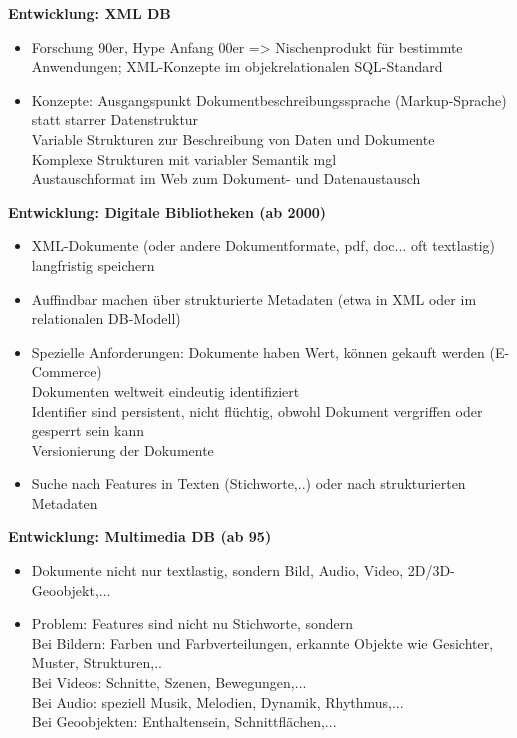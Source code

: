 \textbf{Entwicklung: XML DB}
\begin{itemize}
	\item Forschung 90er, Hype Anfang 00er => Nischenprodukt für bestimmte Anwendungen; XML-Konzepte im objekrelationalen SQL-Standard
	\item Konzepte: Ausgangspunkt Dokumentbeschreibungssprache (Markup-Sprache) statt starrer Datenstruktur\\
	Variable Strukturen zur Beschreibung von Daten und Dokumente\\
	Komplexe Strukturen mit variabler Semantik mgl\\
	Austauschformat im Web zum Dokument- und Datenaustausch
\end{itemize}

\textbf{Entwicklung: Digitale Bibliotheken (ab 2000)}
\begin{itemize}
	\item XML-Dokumente (oder andere Dokumentformate, pdf, doc... oft textlastig) langfristig speichern
	\item Auffindbar machen über strukturierte Metadaten (etwa in XML oder im relationalen DB-Modell)
	\item Spezielle Anforderungen: Dokumente haben Wert, können gekauft werden (E-Commerce)\\
	Dokumenten weltweit eindeutig identifiziert\\
	Identifier sind persistent, nicht flüchtig, obwohl Dokument vergriffen oder gesperrt sein kann\\
	Versionierung der Dokumente
	
	\item Suche nach Features in Texten (Stichworte,..) oder nach strukturierten Metadaten
\end{itemize}

\textbf{Entwicklung: Multimedia DB (ab 95)}
\begin{itemize}
	\item Dokumente nicht nur textlastig, sondern Bild, Audio, Video, 2D/3D-Geoobjekt,...
	\item Problem: Features sind nicht nu Stichworte, sondern\\
	Bei Bildern: Farben und Farbverteilungen, erkannte Objekte wie Gesichter, Muster, Strukturen,..\\
	Bei Videos: Schnitte, Szenen, Bewegungen,...\\
	Bei Audio: speziell Musik, Melodien, Dynamik, Rhythmus,...\\
	Bei Geoobjekten: Enthaltensein, Schnittflächen,...
\end{itemize}


